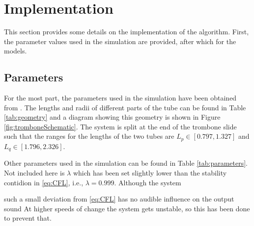 \section{Implementation}\label{sec:implementation}
This section provides some details on the implementation of the algorithm. First, the parameter values used in the simulation are provided, after which for the models.

\subsection{Parameters}
For the most part, the parameters used in the simulation have been obtained from \cite{Harrison2018, Smyth2011, Benade1968}. The lengths and radii of different parts of the tube can be found in Table \ref{tab:geometry} and a diagram showing this geometry is shown in Figure \ref{fig:tromboneSchematic}.
The system is split at the end of the trombone slide such that the ranges for the lengths of the two tubes are $L_p \in[0.797, 1.327]$ and $L_q \in [1.796, 2.326]$.

Other parameters used in the simulation can be found in Table \ref{tab:parameters}. Not included here is $\lambda$ which has been set slightly lower than the stability contidion in \eqref{eq:CFL}, i.e., $\lambda = 0.999$. Although the system 

such a small deviation from \eqref{eq:CFL} has no audible influence on the output sound At higher speeds of change the system gets unstable, so this has been done to prevent that. 

